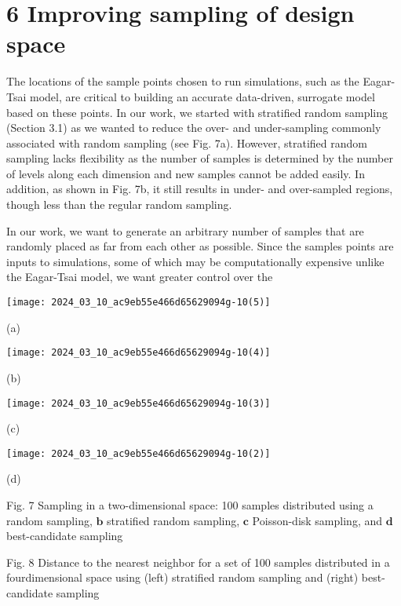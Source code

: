 \documentclass[10pt]{article}
\begin{document}
\section*{6 Improving sampling of design space}
The locations of the sample points chosen to run simulations, such as the Eagar-Tsai model, are critical to building an accurate data-driven, surrogate model based on these points. In our work, we started with stratified random sampling (Section 3.1) as we wanted to reduce the over- and under-sampling commonly associated with random sampling (see Fig. 7a). However, stratified random sampling lacks flexibility as the number of samples is determined by the number of levels along each dimension and new samples cannot be added easily. In addition, as shown in Fig. 7b, it still results in under- and over-sampled regions, though less than the regular random sampling.

In our work, we want to generate an arbitrary number of samples that are randomly placed as far from each other as possible. Since the samples points are inputs to simulations, some of which may be computationally expensive unlike the Eagar-Tsai model, we want greater control over the

\begin{center}
\texttt{[image: 2024\_03\_10\_ac9eb55e466d65629094g-10(5)]}
\end{center}

(a)

\begin{center}
\texttt{[image: 2024\_03\_10\_ac9eb55e466d65629094g-10(4)]}
\end{center}

(b)

\begin{center}
\texttt{[image: 2024\_03\_10\_ac9eb55e466d65629094g-10(3)]}
\end{center}

(c)

\begin{center}
\texttt{[image: 2024\_03\_10\_ac9eb55e466d65629094g-10(2)]}
\end{center}

(d)

Fig. 7 Sampling in a two-dimensional space: 100 samples distributed using a random sampling, $\mathbf{b}$ stratified random sampling, $\mathbf{c}$ Poisson-disk sampling, and $\mathbf{d}$ best-candidate sampling

Fig. 8 Distance to the nearest neighbor for a set of 100 samples distributed in a fourdimensional space using (left) stratified random sampling and (right) best-candidate sampling
\end{document}
